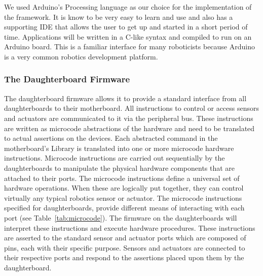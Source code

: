 	We used Arduino's Processing language as our choice for the implementation of the framework. It is know to be very easy to learn and use and also has a supporting IDE that allows the user to get up and started in a short period of time. 
	Applications will be written in a C-like syntax and compiled to run on an Arduino board. This is a familiar interface for many roboticists because Arduino is a very common robotics development platform.
	
	\subsubsection{The Daughterboard Firmware} %
	\label{ssub:the_daughterboard_firmware}
	The daughterboard firmware allows it to provide a standard interface from all daughterboards to their motherboard. All instructions to control or access sensors and actuators are communicated to it via the peripheral bus. These instructions are written as microcode abstractions of the hardware and need to be translated to actual assertions on the devices. Each abstracted command in the motherboard's \xten Library is translated into one or more microcode hardware instructions. Microcode instructions are carried out sequentially by the daughterboards to manipulate the physical hardware components that are attached to their ports. The microcode instructions define a universal set of hardware operations. When these are logically put together, they can control virtually any typical robotics sensor or actuator.
		The microcode instructions specified for daughterboards, provide different means of interacting with each port (see Table~\ref{tab:microcode}).
	The firmware on the daughterboards will interpret these instructions and execute hardware procedures. These instructions are asserted to the standard sensor and actuator ports which are composed of pins, each with their specific purpose. Sensors and actuators are connected to their respective ports and respond to the assertions placed upon them by the daughterboard.
	
